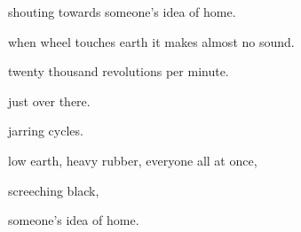\documentclass[extrafontsizes, 48pt]{memoir}
\newcommand\blankpage{%
    \null
    \thispagestyle{empty}%
    \addtocounter{page}{-1}%
    \newpage}
\begin{document}
	\begin{minipage}{.6\textwidth}
	shouting towards someone's idea of home.
	\afterpage{\blankpage}
	\end{minipage}
	\newpage

	\begin{minipage}{.6\textwidth}
	when wheel touches earth it makes almost no sound.
	\end{minipage}
	\newpage

	\begin{minipage}{.6\textwidth}
	twenty thousand revolutions per minute.
	\end{minipage}
	\newpage

	\begin{minipage}{.6\textwidth}
	just over there.
	\end{minipage}
	\newpage

	\begin{minipage}{.6\textwidth}
	jarring cycles.
	\afterpage{\blankpage}
	\end{minipage}
	\newpage

	\begin{minipage}{.6\textwidth}
	low earth, heavy rubber, everyone all at once,
	\end{minipage}
	\newpage

	\begin{minipage}{.6\textwidth}
	screeching black,
	\end{minipage}
	\newpage

	\begin{minipage}{.6\textwidth}
	someone's idea of home.
	\afterpage{\blankpage}
	\end{minipage}
	\newpage
\end{document}
